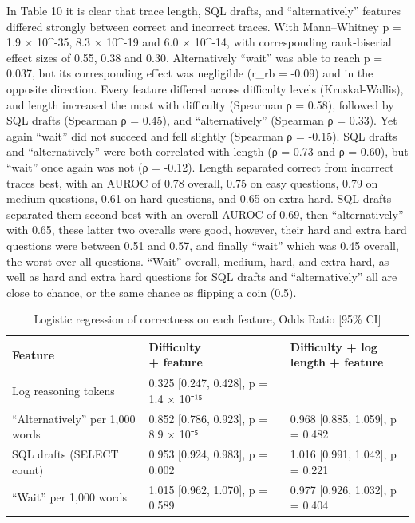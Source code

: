 In Table 10 it is clear that trace length, SQL drafts, and ``alternatively'' features differed strongly between correct and incorrect traces. With Mann--Whitney p = 1.9 × 10\^{}-35, 8.3 × 10\^{}-19 and 6.0 × 10\^{}-14, with corresponding rank-biserial effect sizes of 0.55, 0.38 and 0.30. Alternatively ``wait'' was able to reach p = 0.037, but its corresponding effect was negligible (r\_rb = -0.09) and in the opposite direction. Every feature differed across difficulty levels (Kruskal-Wallis), and length increased the most with difficulty (Spearman ρ = 0.58), followed by SQL drafts (Spearman ρ = 0.45), and ``alternatively'' (Spearman ρ = 0.33). Yet again ``wait'' did not succeed and fell slightly (Spearman ρ = -0.15). SQL drafts and ``alternatively'' were both correlated with length (ρ = 0.73 and ρ = 0.60), but ``wait'' once again was not (ρ = -0.12). Length separated correct from incorrect traces best, with an AUROC of 0.78 overall, 0.75 on easy questions, 0.79 on medium questions, 0.61 on hard questions, and 0.65 on extra hard. SQL drafts separated them second best with an overall AUROC of 0.69, then ``alternatively'' with 0.65, these latter two overalls were good, however, their hard and extra hard questions were between 0.51 and 0.57, and finally ``wait'' which was 0.45 overall, the worst over all questions. ``Wait'' overall, medium, hard, and extra hard, as well as hard and extra hard questions for SQL drafts and ``alternatively'' all are close to chance, or the same chance as flipping a coin (0.5).

\begin{table}[!htbp]
\centering
\caption{Logistic regression of correctness on each feature, Odds Ratio [95\% CI]}
\label{tab:11}
\small
\begin{adjustbox}{max width=\linewidth}
\begin{tabular}{@{}lll@{}}
\toprule
Feature & \makecell{Difficulty \\ {}+ feature} & \makecell{Difficulty + log \\ {}length + feature} \\
\midrule
Log reasoning tokens & 0.325 [0.247, 0.428], p = 1.4 × 10⁻¹⁵ &  \\
``Alternatively'' per 1,000 words & 0.852 [0.786, 0.923], p = 8.9 × 10⁻⁵ & 0.968 [0.885, 1.059], p = 0.482 \\
SQL drafts (SELECT count) & 0.953 [0.924, 0.983], p = 0.002 & 1.016 [0.991, 1.042], p = 0.221 \\
``Wait'' per 1,000 words & 1.015 [0.962, 1.070], p = 0.589 & 0.977 [0.926, 1.032], p = 0.404 \\
\bottomrule
\end{tabular}
\end{adjustbox}
\par{}
\end{table}

